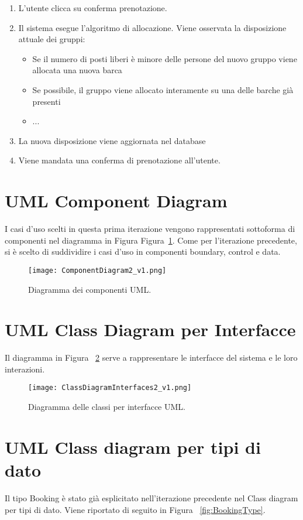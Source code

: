 \begin{enumerate}
    \item L'utente clicca su conferma prenotazione.
    \item Il sistema esegue l'algoritmo di allocazione. Viene osservata la disposizione attuale dei gruppi:
    \begin{itemize}
        \item Se il numero di posti liberi è minore delle persone del nuovo gruppo viene allocata una nuova barca
        \item Se possibile, il gruppo viene allocato interamente su una delle barche già presenti
        \item ...
    \end{itemize}
    \item La nuova disposizione viene aggiornata nel database
    \item Viene mandata una conferma di prenotazione all'utente.
\end{enumerate}

\section{UML Component Diagram}
I casi d’uso scelti in questa prima iterazione vengono rappresentati sottoforma di componenti nel diagramma in Figura Figura~\ref{fig:componentDiagram2}. Come per l'iterazione precedente, si è scelto di suddividire i casi d’uso in componenti boundary, control e data.

\begin{figure}[!ht]
    \centering
    \texttt{[image: ComponentDiagram2\_v1.png]}
    \caption{Diagramma dei componenti UML.}\label{fig:componentDiagram2}
\end{figure}

\section{UML Class Diagram per Interfacce}
Il diagramma in Figura ~\ref{fig:ClassDiagramInterfaces2} serve a rappresentare le interfacce del sistema e le
loro interazioni.

\begin{figure}[!ht]
    \centering
    \texttt{[image: ClassDiagramInterfaces2\_v1.png]}
    \caption{Diagramma delle classi per interfacce UML.}\label{fig:ClassDiagramInterfaces2}
\end{figure}

\section{UML Class diagram per tipi di dato}
Il tipo Booking è stato già esplicitato nell'iterazione precedente nel Class diagram per tipi di dato.
Viene riportato di seguito in Figura ~\ref{fig:BookingType}.

